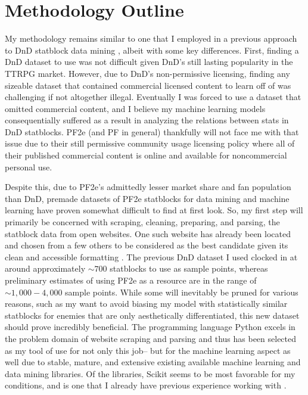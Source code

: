 \documentclass[11pt]{article}
\begin{document}
\section{Methodology Outline}

My methodology remains similar to one that I employed in a previous approach to DnD statblock data mining \cite{vess-dev_2022}, albeit with some key differences. First, finding a DnD dataset to use was not difficult given DnD's still lasting popularity in the TTRPG market. However, due to DnD's non-permissive licensing, finding any sizeable dataset that contained commercial licensed content to learn off of was challenging if not altogether illegal. Eventually I was forced to use a dataset that omitted commercial content, and I believe my machine learning models consequentially suffered as a result in analyzing the relations between stats in DnD statblocks. PF2e (and PF in general) thankfully will not face me with that issue due to their still permissive community usage licensing policy \cite{use_2020} where all of their published commercial content is online and available for noncommercial personal use.

Despite this, due to PF2e's admittedly lesser market share and fan population than DnD, premade datasets of PF2e statblocks for data mining and machine learning have proven somewhat difficult to find at first look. So, my first step will primarily be concerned with scraping, cleaning, preparing, and parsing, the statblock data from open websites. One such website has already been located and chosen from a few others to be considered as the best candidate given its clean and accessible formatting \cite{hemerik}. The previous DnD dataset I used clocked in at around approximately $\sim700$ statblocks to use as sample points, whereas preliminary estimates of using PF2e as a resource are in the range of $\sim1,000-4,000$ sample points. While some will inevitably be pruned for various reasons, such as my want to avoid biasing my model with statistically similar statblocks for enemies that are only aesthetically differentiated, this new dataset should prove incredibly beneficial. The programming language Python excels in the problem domain of website scraping and parsing and thus has been selected as my tool of use for not only this job-- but for the machine learning aspect as well due to stable, mature, and extensive existing available machine learning and data mining libraries. Of the libraries, Scikit \cite{scikit1} seems to be most favorable for my conditions, and is one that I already have previous experience working with \cite{vess-dev_2022}.
\end{document}
